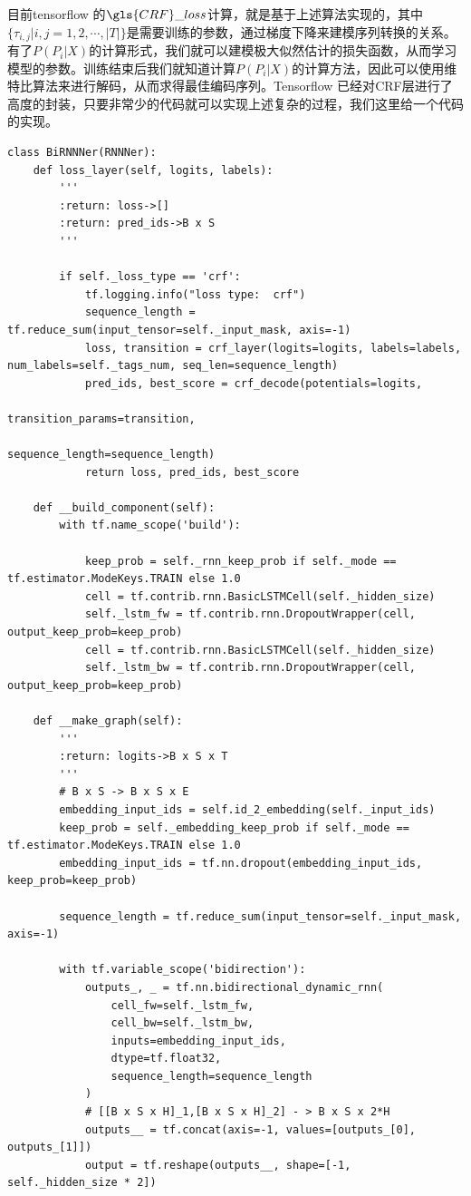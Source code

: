 \documentclass[twoside,a4paper,12pt]{book}%
\begin{document}
目前tensorflow 的$\gls{CRF}\_loss$计算，就是基于上述算法实现的，其中$\{ \tau_{i,j}| i,j=1,2,\cdots,|T|\}$是需要训练的参数，通过梯度下降来建模序列转换的关系。
有了$P(P_i|X)$的计算形式，我们就可以建模极大似然估计的损失函数，从而学习模型的参数。训练结束后我们就知道计算$P(P_i|X)$的计算方法，因此可以使用维特比算法来进行解码，从而求得最佳编码序列。Tensorflow 已经对\gls{CRF}层进行了高度的封装，只要非常少的代码就可以实现上述复杂的过程，我们这里给一个代码的实现。
\begin{lstlisting}
class BiRNNNer(RNNNer):
	def loss_layer(self, logits, labels):
		'''
		:return: loss->[]
		:return: pred_ids->B x S
		'''
		
		if self._loss_type == 'crf':
			tf.logging.info("loss type:  crf")
			sequence_length = tf.reduce_sum(input_tensor=self._input_mask, axis=-1)
			loss, transition = crf_layer(logits=logits, labels=labels, num_labels=self._tags_num, seq_len=sequence_length)
			pred_ids, best_score = crf_decode(potentials=logits,
			                                  transition_params=transition,
			                                  sequence_length=sequence_length)
			return loss, pred_ids, best_score
	
	def __build_component(self):
		with tf.name_scope('build'):

			keep_prob = self._rnn_keep_prob if self._mode == tf.estimator.ModeKeys.TRAIN else 1.0
			cell = tf.contrib.rnn.BasicLSTMCell(self._hidden_size)
			self._lstm_fw = tf.contrib.rnn.DropoutWrapper(cell, output_keep_prob=keep_prob)
			cell = tf.contrib.rnn.BasicLSTMCell(self._hidden_size)
			self._lstm_bw = tf.contrib.rnn.DropoutWrapper(cell, output_keep_prob=keep_prob)
	
	def __make_graph(self):
		'''
		:return: logits->B x S x T
		'''
		# B x S -> B x S x E
		embedding_input_ids = self.id_2_embedding(self._input_ids)
		keep_prob = self._embedding_keep_prob if self._mode == tf.estimator.ModeKeys.TRAIN else 1.0
		embedding_input_ids = tf.nn.dropout(embedding_input_ids, keep_prob=keep_prob)
		
		sequence_length = tf.reduce_sum(input_tensor=self._input_mask, axis=-1)
		
		with tf.variable_scope('bidirection'):
			outputs_, _ = tf.nn.bidirectional_dynamic_rnn(
				cell_fw=self._lstm_fw,
				cell_bw=self._lstm_bw,
				inputs=embedding_input_ids,
				dtype=tf.float32,
				sequence_length=sequence_length
			)
			# [[B x S x H]_1,[B x S x H]_2] - > B x S x 2*H
			outputs__ = tf.concat(axis=-1, values=[outputs_[0], outputs_[1]])
			output = tf.reshape(outputs__, shape=[-1, self._hidden_size * 2])
			

\end{lstlisting}
\end{document}
